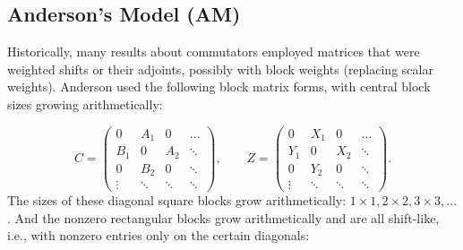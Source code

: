 \documentclass[10pt,reqno]{amsart}
\theoremstyle{remark}
\numberwithin{equation}{section}
\begin{document}
\subsection*{Anderson's Model (AM)}

Historically, many results about commutators employed matrices that were weighted shifts or their adjoints, possibly with block weights (replacing scalar weights).
Anderson used the following block matrix forms, with central block sizes growing arithmetically:

\begin{equation}
  \label{eq6}
  C =
  \begin{pmatrix}
    0 &  A_1  &0  &\dots          \\
    B_1 & 0 & A_2   &\ddots           \\
    0 &B_2 & 0 &\ddots            \\
    \vdots &\ddots &\ddots  &\ddots
  \end{pmatrix},\quad\quad
  Z =
  \begin{pmatrix}
    0 &  X_1  &0  &\dots          \\
    Y_1 & 0 & X_2   &\ddots           \\
    0 & Y_2 & 0 &\ddots            \\
    \vdots &\ddots &\ddots  &\ddots
  \end{pmatrix}.
\end{equation}
The sizes of these diagonal square blocks grow arithmetically: $1\times 1, 2\times 2, 3\times 3, \dots$.
And the  nonzero rectangular blocks grow arithmetically and are all shift-like, i.e., with nonzero entries only on the certain diagonals:
\end{document}
